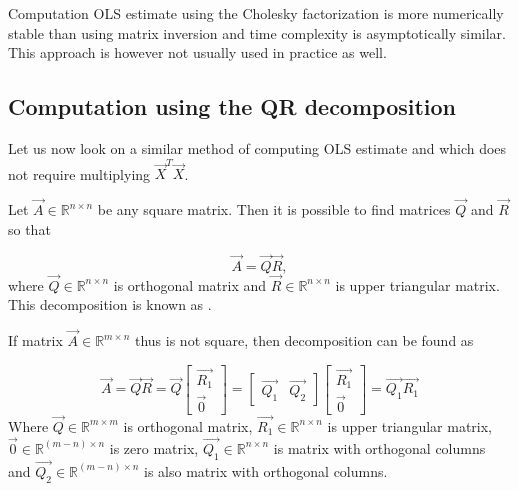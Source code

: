 
Computation OLS estimate using the Cholesky factorization is more numerically stable than using matrix inversion and time complexity is asymptotically similar. This approach is however not usually used in practice as well. 



\subsection{Computation using the QR decomposition}

Let us now look on a similar method of computing OLS estimate and which does not require multiplying $\vec{X}^T\vec{X}$. 

\begin{definition}
    Let $\vec{A} \in \mathbb{R}^{n \times n}$ be any square matrix. Then it is possible to find matrices $\vec{Q}$ and $\vec{R}$ so that 

    \begin{equation}
        \vec{A} = \vec{Q}\vec{R},
    \end{equation}
    where $\vec{Q} \in \mathbb{R}^{n \times n}$ is orthogonal matrix and $\vec{R} \in \mathbb{R}^{n \times n}$ is upper triangular matrix. 
This decomposition is known as .
\end{definition}
If matrix $\vec{A} \in \mathbb{R}^{m \times n}$ thus is not square, then decomposition can be found as

\begin{equation} \label{matrixq1r1}
    \vec{A} = \vec{Q}\vec{R} = \vec{Q} \begin{bmatrix}
        \vec{R_1} \\
        \vec{0}
    \end{bmatrix}
    =  \begin{bmatrix}
        \vec{Q_1} & \vec{Q_2}
    \end{bmatrix}  \begin{bmatrix}
        \vec{R_1} \\
        \vec{0}
    \end{bmatrix} 
    = \vec{Q_1} \vec{R_1}
\end{equation}
    Where $\vec{Q} \in \mathbb{R}^{m \times m}$ is orthogonal matrix, $\vec{R_1} \in \mathbb{R}^{n \times n} $ is upper triangular matrix, $\vec{0} \in \mathbb{R}^{ (m-n) \times n} $  is zero matrix,  $\vec{Q_1} \in \mathbb{R}^{n \times n}$ is matrix with orthogonal columns and  $\vec{Q_2} \in \mathbb{R}^{(m-n) \times n}$ is also matrix with orthogonal columns.
    
